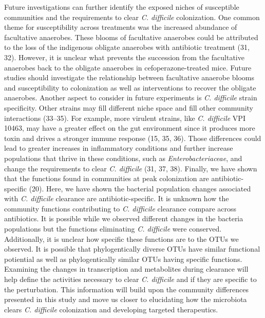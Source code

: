 \documentclass[11pt,]{article}
\begin{document}
Future investigations can further identify the exposed niches of
susceptible communities and the requirements to clear \emph{C.
difficile} colonization. One common theme for susceptibility across
treatments was the increased abundance of facultative anaerobes. These
blooms of facultative anaerobes could be attributed to the loss of the
indigenous obligate anaerobes with antibiotic treatment (31, 32).
However, it is unclear what prevents the succession from the facultative
anaerobes back to the obligate anaerobes in cefoperazone-treated mice.
Future studies should investigate the relationship between facultative
anaerobe blooms and susceptibility to colonization as well as
interventions to recover the obligate anaerobes. Another aspect to
consider in future experiments is \emph{C. difficile} strain
specificity. Other strains may fill different niche space and fill other
community interactions (33--35). For example, more virulent strains,
like \emph{C. difficile} VPI 10463, may have a greater effect on the gut
environment since it produces more toxin and drives a stronger immune
response (15, 35, 36). Those differences could lead to greater increases
in inflammatory conditions and further increase populations that thrive
in these conditions, such as \emph{Enterobacteriaceae}, and change the
requirements to clear \emph{C. difficile} (31, 37, 38). Finally, we have
shown that the functions found in communities at peak colonization are
antibiotic-specific (20). Here, we have shown the bacterial population
changes associated with \emph{C. difficile} clearance are
antibiotic-specific. It is unknown how the community functions
contributing to \emph{C. difficile} clearance compare across
antibiotics. It is possible while we observed different changes in the
bacteria populations but the functions eliminating \emph{C. difficile}
were conserved. Additionally, it is unclear how specific these functions
are to the OTUs we observed. It is possible that phylogentically diverse
OTUs have similar functional potiential as well as phylogentically
similar OTUs having specific functions. Examining the changes in
transcription and metabolites during clearance will help define the
activities necessary to clear \emph{C. difficile} and if they are
specific to the perturbation. This information will build upon the
community differences presented in this study and move us closer to
elucidating how the microbiota clears \emph{C. difficile} colonization
and developing targeted therapeutics.
\end{document}
